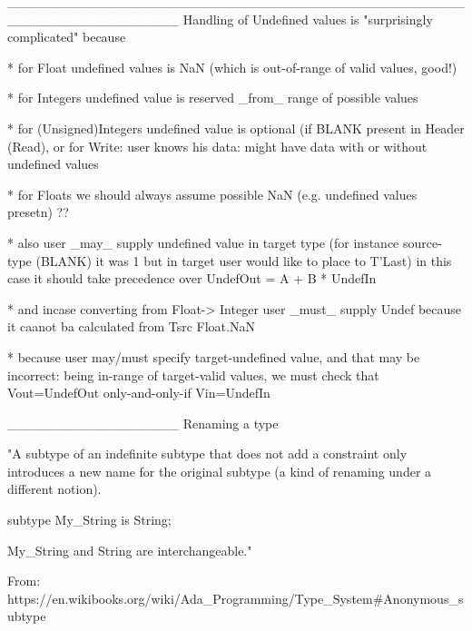 __________________________________________________________________
Handling of Undefined values is "surprisingly complicated" because

* for Float undefined values is NaN (which is out-of-range of valid values, good!) 

* for Integers undefined value is reserved _from_ range of possible values

* for (Unsigned)Integers undefined value is optional (if BLANK present in Header (Read),
or for Write: user knows his data: might have data with or without undefined values

* for Floats we should always assume possible NaN (e.g. undefined values presetn) ??

* also user _may_ supply undefined value in target type (for instance
source-type (BLANK) it was 1 but in target user would like to place to T'Last)
in this case it should take precedence over UndefOut = A + B * UndefIn

* and incase converting from Float-> Integer user _must_ supply Undef
because it caanot ba calculated from Tsrc Float.NaN

* because user may/must specify target-undefined value, and that may be
incorrect: being in-range of target-valid values, we must check
that Vout=UndefOut only-and-only-if Vin=UndefIn




__________________
Renaming a type

"A subtype of an indefinite subtype that does not add a constraint only
introduces a new name for the original subtype (a kind of renaming under a different notion).

subtype My_String is String;

My_String and String are interchangeable."

From: https://en.wikibooks.org/wiki/Ada_Programming/Type_System#Anonymous_subtype





